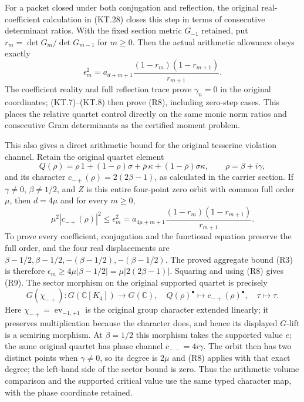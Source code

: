 For a packet closed under both conjugation and reflection, the
original real-coefficient calculation in (KT.28) closes this step
in terms of consecutive determinant ratios.  With the fixed
section metric \(G_{-1}\) retained, put
\(r_m=\det G_m/\det G_{m-1}\) for \(m\ge0\).
Then the actual arithmetic allowance obeys exactly
\[
 \boxed{\epsilon_m^2
   =a_{d+m+1}\frac{(1-r_m)(1-r_{m+1})}{r_{m+1}}.}
 \tag{R8}
\]
The coefficient reality and full reflection trace prove
\(\gamma_n=0\) in the original coordinates; (KT.7)--(KT.8)
then prove (R8), including zero-step cases.  This places the
relative quartet control directly on the same monic norm ratios
and consecutive Gram determinants as the certified moment problem.

This also gives a direct arithmetic bound for the original tesserine
violation channel.  Retain the original quartet element
\[
 Q(\rho)=\rho\,1+(1-\rho)\sigma
       +\overline\rho\,\kappa+(1-\overline\rho)\sigma\kappa,
 \qquad \rho=\beta+i\gamma,
\]
and its character \(c_{-+}(\rho)=2(2\beta-1)\), as calculated
in the carrier section.  If \(\gamma\ne0\), \(\beta\ne1/2\),
and \(Z\) is this entire four-point zero orbit with common full
order \(\mu\), then \(d=4\mu\) and for every \(m\ge0\),
\[
 \boxed{
 \mu^2|c_{-+}(\rho)|^2
   \le \epsilon_m^2
   =a_{4\mu+m+1}\frac{(1-r_m)(1-r_{m+1})}{r_{m+1}}.}
 \tag{R9}
\]
To prove every coefficient, conjugation and the functional equation
preserve the full order, and the four real displacements are
\(\beta-1/2,\beta-1/2,-(\beta-1/2),-(\beta-1/2)\).
The proved aggregate bound (R3) is therefore
\(\epsilon_m\ge4\mu|\beta-1/2|
=\mu|2(2\beta-1)|\).  Squaring and using (R8) gives (R9).
The sector morphism on the original supported quartet is precisely
\[
 G(\chi_{-+}):G(\mathbb C[K_4])\longrightarrow G(\mathbb C),
 \quad Q(\rho)^\bullet\longmapsto
                   c_{-+}(\rho)^\bullet,\quad\tau\longmapsto\tau.
\]
Here \(\chi_{-+}=\operatorname{ev}_{-1,+1}\) is the original group character extended
linearly; it preserves multiplication because the character does,
and hence its displayed \(G\)-lift is a semiring morphism.
At \(\beta=1/2\) this morphism takes the supported value \(e\);
the same original quartet has phase channel \(c_{--}=4i\gamma\).
The orbit then has two distinct points when \(\gamma\ne0\), so
its degree is \(2\mu\) and (R8) applies with that exact degree;
the left-hand side of the sector bound is zero.  Thus the arithmetic
volume comparison and the supported critical value use the same
typed character map, with the phase coordinate retained.

